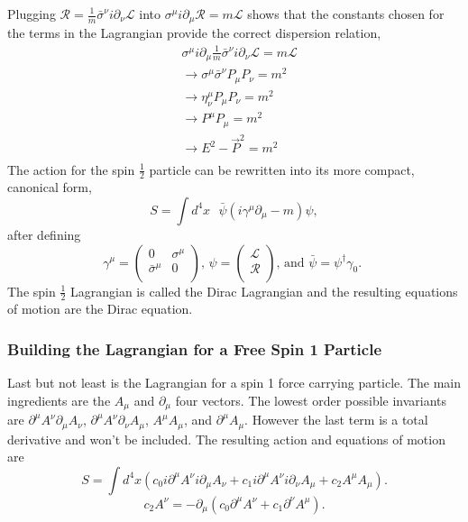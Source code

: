 Plugging $\mathcal{R} = \frac{1}{m}\bar{\sigma}^\nu i\partial_\nu\mathcal{L}$ into $\sigma^\mu i\partial_\mu\mathcal{R} = m\mathcal{L}$ shows that the constants chosen for the terms in the Lagrangian provide the correct dispersion relation,
\begin{equation}
\begin{split}
&\sigma^\mu i\partial_\mu \frac{1}{m}\bar{\sigma}^\nu i\partial_\nu\mathcal{L} = m\mathcal{L} \\
&\rightarrow \sigma^\mu \bar{\sigma}^\nu P_\mu P_\nu = m^2 \\
&\rightarrow \eta^\mu_\nu P_\mu P_\nu = m^2 \\
&\rightarrow P^\mu P_\mu = m^2 \\
&\rightarrow E^2 - \vec{P}^2 = m^2 \\
\end{split}
\end{equation}
The action for the spin $\frac{1}{2}$ particle can be rewritten into its more compact, canonical form,
\begin{equation}
S = \int d^4x \text{ } \bar{\psi} \left(i\gamma^\mu\partial_\mu - m\right)\psi,
\end{equation} 
after defining
\begin{equation}
\gamma^\mu =
\begin{pmatrix}
0 & \sigma^\mu \\
\bar{\sigma}^\mu & 0 \\
\end{pmatrix}
\text{, } 
\psi =
\begin{pmatrix}
\mathcal{L} \\
\mathcal{R} \\
\end{pmatrix}
\text{, and } 
\bar{\psi} =
\psi^\dagger \gamma_0 \text{. }
\end{equation}
The spin $\frac{1}{2}$ Lagrangian is called the Dirac Lagrangian and the resulting equations of motion are the Dirac equation.

\subsubsection{Building the Lagrangian for a Free Spin 1 Particle}
Last but not least is the Lagrangian for a spin 1 force carrying particle. The main ingredients are the $A_\mu$ and $\partial_\mu$ four vectors. The lowest order possible invariants are $\partial^\mu A^\nu\partial_\mu A_\nu$, $\partial^\mu A^\nu\partial_\nu A_\mu$, $A^\mu A_\mu$, and $\partial^\mu A_\mu$. However the last term is a total derivative and won't be included. The resulting action and equations of motion are 
\begin{equation}
S = \int d^4x \left( c_0 i\partial^\mu A^\nu i\partial_\mu A_\nu + c_1 i\partial^\mu A^\nu i\partial_\nu A_\mu + c_2 A^\mu A_\mu \right).
\end{equation}
\begin{equation}
c_2 A^\nu = -\partial_\mu\left(c_0 \partial^\mu A^\nu + c_1 \partial^\nu A^\mu\right).
\end{equation}

